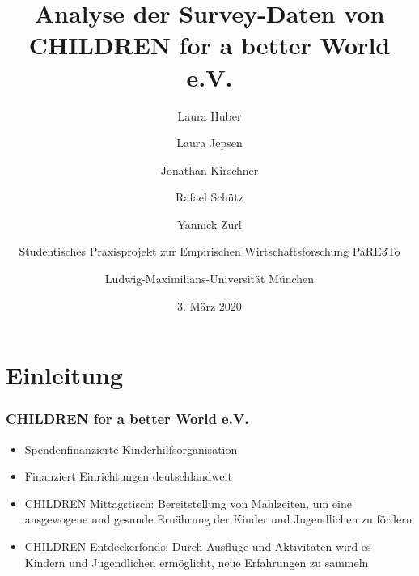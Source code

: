 

%





\title[Analyse der Survey-Daten von CHILDREN]{Analyse der Survey-Daten von CHILDREN for a better World e.V.
	}
\author[Laura, Laura, Jonathan, Rafael und Yannick]{
Laura Huber\\
\and
Laura Jepsen\\
\and
Jonathan Kirschner\\
\and
Rafael Schütz\\
\and
Yannick Zurl\\
\and
Studentisches Praxisprojekt zur Empirischen Wirtschaftsforschung PaRE3To\\
\and
Ludwig-Maximilians-Universität München}
\date{3. März 2020}


\begin{frame}
	\maketitle
\end{frame}



\section{Einleitung}

\begin{frame}[fragile]
\frametitle{CHILDREN for a better World e.V.}

\begin{itemize}
 \item<1-> Spendenfinanzierte Kinderhilfsorganisation
 \item<2-> Finanziert Einrichtungen deutschlandweit
 \linebreak
 \item<3-> CHILDREN Mittagstisch: Bereitstellung von Mahlzeiten, um eine ausgewogene und gesunde Ernährung der Kinder und Jugendlichen zu fördern
 \item<4-> CHILDREN Entdeckerfonds: Durch Ausflüge und Aktivitäten wird es Kindern und Jugendlichen ermöglicht, neue Erfahrungen zu sammeln
\end{itemize}

\end{frame}

